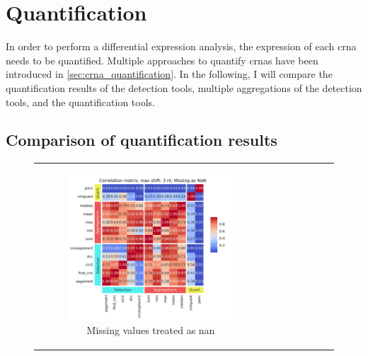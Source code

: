 \section{Quantification}

In order to perform a differential expression analysis, the expression of each
\gls{crna} needs to be quantified.
Multiple approaches to quantify \glspl{crna} have been introduced in
\cref{sec:crna_quantification}.
In the following, I will compare the quantification results of the detection
tools, multiple aggregations of the detection tools, and the quantification
tools.

\subsection{Comparison of quantification results}
\begin{figure}[ht] \begin{tabular}{cc} \begin{subfigure}{0.5\textwidth}
            \centering

            \includegraphics[width=\linewidth]{chapters/4_results_and_discussion/figures/quantification/correlation_heatmap_3_na.png}
            \caption{Missing values treated as \gls{nan}}
            \label{fig:correlation_heatmap_3_na}
        \end{subfigure} & \begin{subfigure}{0.5\textwidth} \centering


\end{subfigure}
\end{tabular}
\end{figure}
